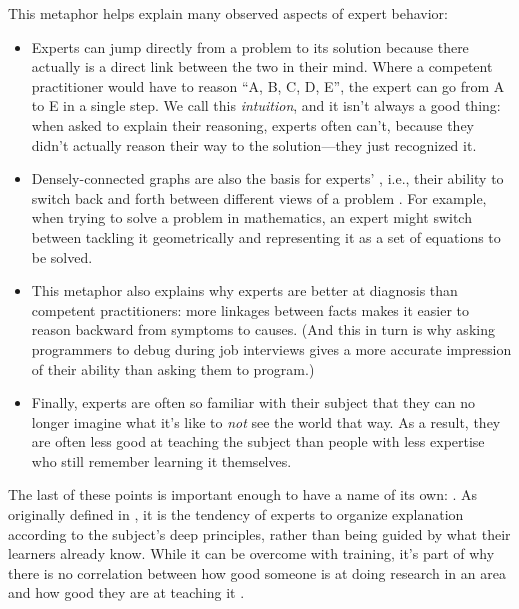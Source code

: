 \newpage %

This metaphor helps explain many observed aspects of expert behavior:

\begin{itemize}

\item
  Experts can jump directly from a problem to its solution because there
  actually is a direct link between the two in their mind. Where a
  competent practitioner would have to reason ``A, B, C, D, E'', the
  expert can go from A to E in a single step. We call this
  \emph{intuition}, and it isn't always a good thing: when asked to
  explain their reasoning, experts often can't, because they didn't
  actually reason their way to the solution---they just recognized it.

\item
  Densely-connected graphs are also the basis for experts'
  , i.e.,
  their ability to switch back and forth between different views of a
  problem \cite{Petr2016}. For example, when trying to solve a problem
  in mathematics, an expert might switch between tackling it
  geometrically and representing it as a set of equations to be
  solved.

\item
  This metaphor also explains why experts are better at diagnosis than
  competent practitioners: more linkages between facts makes it easier
  to reason backward from symptoms to causes. (And this in turn is why
  asking programmers to debug during job interviews gives a more
  accurate impression of their ability than asking them to program.)

\item
  Finally, experts are often so familiar with their subject that they
  can no longer imagine what it's like to \emph{not} see the world
  that way. As a result, they are often less good at teaching the
  subject than people with less expertise who still remember learning
  it themselves.

\end{itemize}

The last of these points is important enough to have a name of its
own: .  As originally
defined in \cite{Nath2003}, it is the tendency of experts to organize
explanation according to the subject's deep principles, rather than
being guided by what their learners already know.  While it can be
overcome with training, it's part of why there is no correlation
between how good someone is at doing research in an area and how good
they are at teaching it \cite{Mars2002}.

